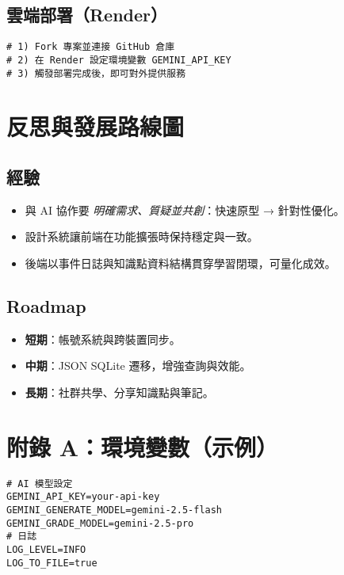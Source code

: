 \documentclass[12pt,a4paper]{article}
\begin{document}
\subsection{雲端部署（Render）}
\begin{lstlisting}[style=bash, caption={Render 部署流程（摘要）}]
# 1) Fork 專案並連接 GitHub 倉庫
# 2) 在 Render 設定環境變數 GEMINI_API_KEY
# 3) 觸發部署完成後，即可對外提供服務
\end{lstlisting}

\section{反思與發展路線圖}
\subsection{經驗}
\begin{itemize}
  \item 與 AI 協作要 \emph{明確需求、質疑並共創}：快速原型 → 針對性優化。
  \item 設計系統讓前端在功能擴張時保持穩定與一致。
  \item 後端以事件日誌與知識點資料結構貫穿學習閉環，可量化成效。
\end{itemize}

\subsection{Roadmap}
\begin{itemize}
  \item \textbf{短期}：帳號系統與跨裝置同步。
  \item \textbf{中期}：JSON \textrightarrow{} SQLite 遷移，增強查詢與效能。
  \item \textbf{長期}：社群共學、分享知識點與筆記。
\end{itemize}

\section*{附錄 A：環境變數（示例）}
\begin{lstlisting}[style=bash]
# AI 模型設定
GEMINI_API_KEY=your-api-key
GEMINI_GENERATE_MODEL=gemini-2.5-flash
GEMINI_GRADE_MODEL=gemini-2.5-pro
# 日誌
LOG_LEVEL=INFO
LOG_TO_FILE=true
\end{lstlisting}

\end{document}
